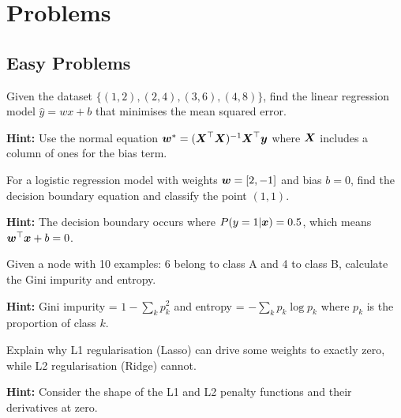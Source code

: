 








\section*{Problems}

\subsection*{Easy Problems}

\begin{problem}
\label{prob:linear-regression-basics}
Given the dataset $\{(1, 2), (2, 4), (3, 6), (4, 8)\}$, find the linear regression model $\hat{y} = wx + b$ that minimises the mean squared error.

\textbf{Hint:} Use the normal equation $\boldsymbol{w}^* = (\boldsymbol{X}^\top \boldsymbol{X})^{-1} \boldsymbol{X}^\top \boldsymbol{y}$ where $\boldsymbol{X}$ includes a column of ones for the bias term.
\end{problem}

\begin{problem}
\label{prob:logistic-decision-boundary}
For a logistic regression model with weights $\boldsymbol{w} = [2, -1]$ and bias $b = 0$, find the decision boundary equation and classify the point $(1, 1)$.

\textbf{Hint:} The decision boundary occurs where $P(y=1|\boldsymbol{x}) = 0.5$, which means $\boldsymbol{w}^\top \boldsymbol{x} + b = 0$.
\end{problem}

\begin{problem}
\label{prob:decision-tree-splitting}
Given a node with 10 examples: 6 belong to class A and 4 to class B, calculate the Gini impurity and entropy.

\textbf{Hint:} Gini impurity = $1 - \sum_{k} p_k^2$ and entropy = $-\sum_{k} p_k \log p_k$ where $p_k$ is the proportion of class $k$.
\end{problem}

\begin{problem}
\label{prob:regularization-effect}
Explain why L1 regularisation (Lasso) can drive some weights to exactly zero, while L2 regularisation (Ridge) cannot.

\textbf{Hint:} Consider the shape of the L1 and L2 penalty functions and their derivatives at zero.
\end{problem}

